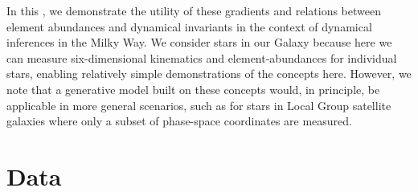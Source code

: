 \documentclass[modern]{aastex63}
\begin{document}
In this \documentname, we demonstrate the utility of these gradients and
relations between element abundances and dynamical invariants in the context of
dynamical inferences in the Milky Way.
We consider stars in our Galaxy because here we can measure six-dimensional
kinematics and element-abundances for individual stars, enabling relatively
simple demonstrations of the concepts here.
However, we note that a generative model built on these concepts would, in
principle, be applicable in more general scenarios, such as for stars in Local
Group satellite galaxies where only a subset of phase-space coordinates are
measured.


\section{Data}
\label{sec:data}
\end{document}
